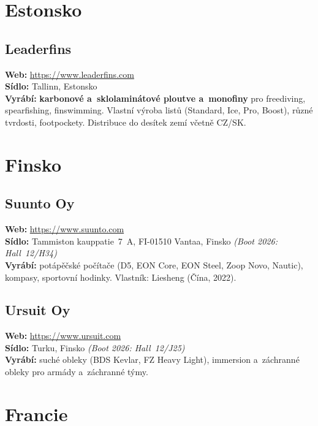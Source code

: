 \documentclass[11pt,a4paper]{article}
\begin{document}
\section{Estonsko}

\subsection{Leaderfins}
\textbf{Web:} \url{https://www.leaderfins.com} \\
\textbf{Sídlo:} Tallinn, Estonsko \\
\textbf{Vyrábí:} \textbf{karbonové a~sklolaminátové ploutve a~monofiny} pro freediving, spearfishing, finswimming. Vlastní výroba listů (Standard, Ice, Pro, Boost), různé tvrdosti, footpockety. Distribuce do desítek zemí včetně CZ/SK.

\section{Finsko}

\subsection{Suunto Oy}
\textbf{Web:} \url{https://www.suunto.com} \\
\textbf{Sídlo:} Tammiston kauppatie~7~A, FI-01510 Vantaa, Finsko \quad\emph{(Boot 2026: Hall~12/H34)} \\
\textbf{Vyrábí:} potápěčské počítače (D5, EON Core, EON Steel, Zoop Novo, Nautic), kompasy, sportovní hodinky. Vlastník: Liesheng (Čína, 2022).

\subsection{Ursuit Oy}
\textbf{Web:} \url{https://www.ursuit.com} \\
\textbf{Sídlo:} Turku, Finsko \quad\emph{(Boot 2026: Hall~12/J25)} \\
\textbf{Vyrábí:} suché obleky (BDS Kevlar, FZ Heavy Light), immersion a~záchranné obleky pro armády a~záchranné týmy.

\section{Francie}
\end{document}
